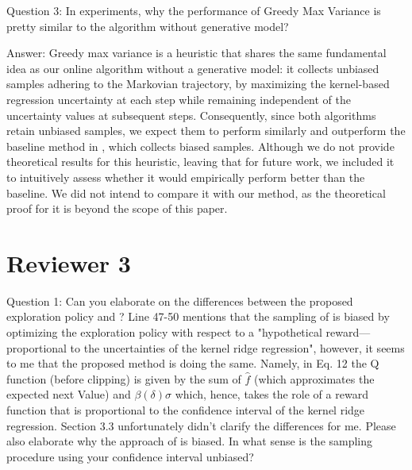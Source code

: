 \documentclass{article}
\begin{document}
Question 3: In experiments, why the performance of Greedy Max Variance is pretty similar to the algorithm without generative model?

Answer: Greedy max variance is a heuristic that shares the same fundamental idea as our online algorithm without a generative model: it collects unbiased samples adhering to the Markovian trajectory, by maximizing the kernel-based regression uncertainty at each step while remaining independent of the uncertainty values at subsequent steps. Consequently, since both algorithms retain unbiased samples, we expect them to perform similarly and outperform the baseline method in \cite{qiu2021reward}, which collects biased samples. Although we do not provide theoretical results for this heuristic, leaving that for future work, we included it to intuitively assess whether it would empirically perform better than the baseline. We did not intend to compare it with our method, as the theoretical proof for it is beyond the scope of this paper.

\section*{Reviewer 3}

Question 1: Can you elaborate on the differences between the proposed exploration policy and \cite{qiu2021reward}? Line 47-50 mentions that the sampling of \cite{qiu2021reward} is biased by optimizing the exploration policy with respect to a "hypothetical reward---proportional to the uncertainties of the kernel ridge regression", however, it seems to me that the proposed method is doing the same. Namely, in Eq. 12 the Q function (before clipping) is given by the sum of $\hat{f}$
 (which approximates the expected next Value) and $\beta(\delta) \sigma$
 which, hence, takes the role of a reward function that is proportional to the confidence interval of the kernel ridge regression. Section 3.3 unfortunately didn't clarify the differences for me. Please also elaborate why the approach of \cite {qiu2021reward} is biased. In what sense is the sampling procedure using your confidence interval unbiased?
\end{document}
